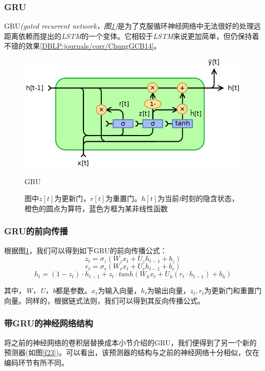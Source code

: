 \documentclass[12pt]{template}
\begin{document}
\subsubsection{GRU}
GRU\textit{(gated recurrent network，图\ref{f22})}是为了克服循环神经网络中无法很好的处理远距离依赖而提出的\textit{LSTM}的一个变体。它相较于\textit{LSTM}来说更加简单，但仍保持着不错的效果\ref{DBLP:journals/corr/ChungGCB14}。

\begin{figure}[htbp]
    \centering
    \includegraphics[width=13.5cm]{GRU.png}
    \caption{GRU}
    \captionsetup{font=small,margin=30pt}\caption*{图中\(z[t]\)为更新门，\(r[t]\)为重置门。\(h[t]\)为当前\textit{t}时刻的隐含状态，橙色的圆点为算符，蓝色方框为某非线性函数}
    \label{f22}
\end{figure}

\subsubsection{GRU的前向传播}
根据图\ref{f22}，我们可以得到如下GRU的前向传播公式：
\begin{equation}
z_t=\sigma_z(W_zx_t+U_zh_{t-1}+b_z) 
\end{equation}
\begin{equation}
r_t=\sigma_r(W_rx_t+U_rh_{t-1}+b_r) 
\end{equation}
\begin{equation}
h_t=(1-z_t)\cdot h_{t-1}+z_t\cdot tanh(W_hx_t+U_h(r_t\cdot h_{t-1})+b_h)
\end{equation}

其中，\textit{W，U，b}都是参数。\(x_t\)为输入向量，\(h_t\)为输出向量，\(z_t,r_t\)为更新门和重置门向量。同样的，根据链式法则，我们可以得到其反向传播公式。
\subsubsection{带GRU的神经网络结构}
将之前的神经网络的卷积层替换成本小节介绍的GRU，我们便得到了另一个新的预测器(如图\ref{f23})。可以看出，该预测器的结构与之前的神经网络十分相似，仅在编码环节有所不同。
\end{document}
